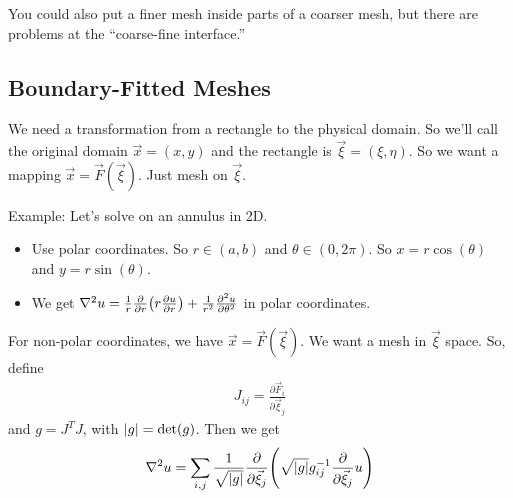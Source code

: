 \documentclass{article}
\begin{document}
            You could also put a finer mesh inside parts of a coarser mesh, but there are problems at the ``coarse-fine interface.''

        \subsection{Boundary-Fitted Meshes}
            We need a transformation from a rectangle to the physical domain.  So we'll call the original domain $\vec{x} = (x,y)$ and the rectangle is $\vec{\xi} = (\xi,\eta)$.  So we want a mapping $\vec{x} = \vec{F}(\vec{\xi})$.  Just mesh on $\vec{\xi}$.

            Example: Let's solve on an annulus in 2D.
            \begin{itemize}
                \item Use polar coordinates.  So $r \in (a,b)$ and $\theta \in (0,2\pi)$.  So $x = r\cos(\theta)$ and $y = r\sin(\theta)$.
                \begin{figure}
                    \centering
                    \hfill
                \end{figure}
                \item We get $\laplacian u = \frac{1}{r}\frac{\partial}{\partial r}\qty(r\frac{\partial u}{\partial r}) + \frac{1}{r^2}\frac{\partial^2 u}{\partial \theta^2}$ in polar coordinates.
            \end{itemize}
            For  non-polar coordinates, we have $\vec{x} = \vec{F}(\vec{\xi})$.  We want a mesh in $\vec{\xi}$ space.  So, define
            \begin{align}
                J_{ij} = \frac{\partial \vec{F}_i}{\partial \vec{\xi}_j}
            \end{align}
            and $g = J^TJ$, with $\abs{g} = \text{det}(g)$.  Then we get
            \begin{align}
                \laplacian u = \sum_{i,j}\frac{1}{\sqrt{\abs{g}}}\frac{\partial}{\partial \vec{\xi}_j}\qty(\sqrt{\abs{g}}g_{ij}^{-1}\frac{\partial}{\partial\vec{\xi}_j}u)
            \end{align}
\end{document}
